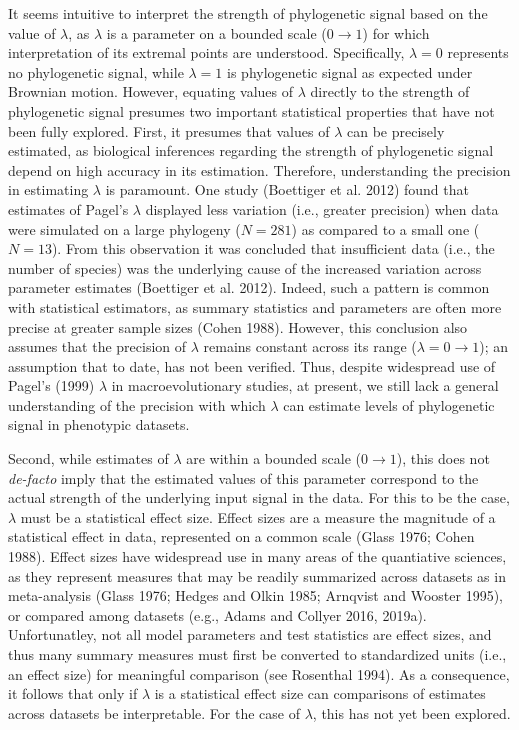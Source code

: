 \documentclass[
]{article}
\begin{document}
It seems intuitive to interpret the strength of phylogenetic signal
based on the value of \(\lambda\), as \(\lambda\) is a parameter on a
bounded scale (\(0\to1\)) for which interpretation of its extremal
points are understood. Specifically, \(\lambda=0\) represents no
phylogenetic signal, while \(\lambda=1\) is phylogenetic signal as
expected under Brownian motion. However, equating values of \(\lambda\)
directly to the strength of phylogenetic signal presumes two important
statistical properties that have not been fully explored. First, it
presumes that values of \(\lambda\) can be precisely estimated, as
biological inferences regarding the strength of phylogenetic signal
depend on high accuracy in its estimation. Therefore, understanding the
precision in estimating \(\lambda\) is paramount. One study (Boettiger
et al. 2012) found that estimates of Pagel's \(\lambda\) displayed less
variation (i.e., greater precision) when data were simulated on a large
phylogeny (\(N=281\)) as compared to a small one (\(N=13\)). From this
observation it was concluded that insufficient data (i.e., the number of
species) was the underlying cause of the increased variation across
parameter estimates (Boettiger et al. 2012). Indeed, such a pattern is
common with statistical estimators, as summary statistics and parameters
are often more precise at greater sample sizes (Cohen 1988). However,
this conclusion also assumes that the precision of \(\lambda\) remains
constant across its range (\(\lambda = 0 \to 1\)); an assumption that to
date, has not been verified. Thus, despite widespread use of Pagel's
(1999) \(\lambda\) in macroevolutionary studies, at present, we still
lack a general understanding of the precision with which \(\lambda\) can
estimate levels of phylogenetic signal in phenotypic datasets.
\hfill\break

Second, while estimates of \(\lambda\) are within a bounded scale
(\(0\to1\)), this does not \emph{de-facto} imply that the estimated
values of this parameter correspond to the actual strength of the
underlying input signal in the data. For this to be the case,
\(\lambda\) must be a statistical effect size. Effect sizes are a
measure the magnitude of a statistical effect in data, represented on a
common scale (Glass 1976; Cohen 1988). Effect sizes have widespread use
in many areas of the quantiative sciences, as they represent measures
that may be readily summarized across datasets as in meta-analysis
(Glass 1976; Hedges and Olkin 1985; Arnqvist and Wooster 1995), or
compared among datasets (e.g., Adams and Collyer 2016, 2019a).
Unfortunatley, not all model parameters and test statistics are effect
sizes, and thus many summary measures must first be converted to
standardized units (i.e., an effect size) for meaningful comparison (see
Rosenthal 1994). As a consequence, it follows that only if \(\lambda\)
is a statistical effect size can comparisons of estimates across
datasets be interpretable. For the case of \(\lambda\), this has not yet
been explored. \hfill\break
\end{document}
